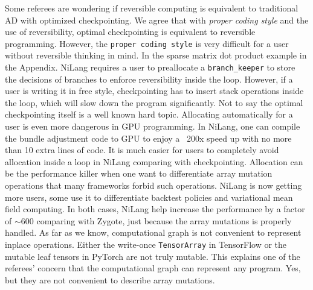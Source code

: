 \documentclass{article}
\begin{document}
Some referees are wondering if reversible computing is equivalent to traditional AD with optimized checkpointing.
We agree that with \textit{proper coding style} and the use of reversibility, optimal checkpointing is equivalent to reversible programming.
However, the \texttt{proper coding style} is very difficult for a user without reversible thinking in mind.
In the sparse matrix dot product example in the Appendix.
NiLang requires a user to preallocate a \texttt{branch\_keeper} to store the decisions of branches to enforce reversibility inside the loop.
However, if a user is writing it in free style, checkpointing has to insert stack operations inside the loop, which will slow down the program significantly.
Not to say the optimal checkpointing itself is a well known hard topic.
Allocating automatically for a user is even more dangerous in GPU programming.
In NiLang, one can compile the bundle adjustment code to GPU to enjoy a ~200x speed up with no more than 10 extra lines of code.
It is much easier for users to completely avoid allocation inside a loop in NiLang comparing with checkpointing.
Allocation can be the performance killer when one want to differentiate array mutation operations that many frameworks forbid such operations.
NiLang is now getting more users, some use it to differentiate backtest policies and variational mean field computing. In both cases, NiLang help increase the performance by a factor of $\sim600$ comparing with Zygote, just because the array mutations is properly handled.
As far as we know, computational graph is not convenient to represent inplace operations.
Either the write-once \texttt{TensorArray} in TensorFlow or the mutable leaf tensors in PyTorch are not truly mutable.
This explains one of the referees' concern that the computational graph can represent any program.
Yes, but they are not convenient to describe array mutations.

\end{document}
